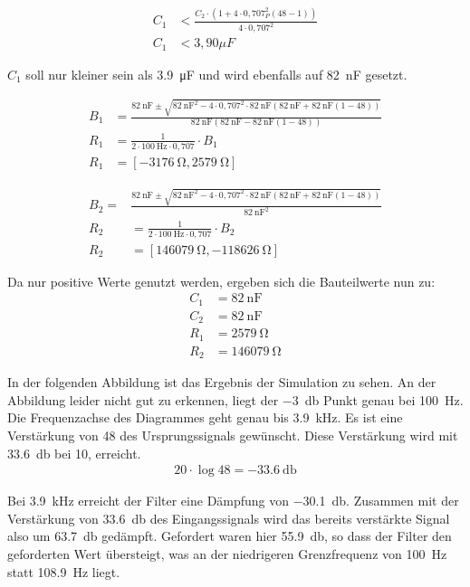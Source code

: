 \begin{align*}
C_1&<\frac{C_2\cdot(1+4\cdot0,707^2_P(48-1))}{4\cdot0,707^2}\\
C_1&<3,90\mu F
\end{align*}

$C_1$ soll nur kleiner sein als \SI{3,9}{\micro\farad} und wird ebenfalls auf \SI{82}{\nano\farad} gesetzt.

\begin{align*}
B_1&=\frac{\SI{82}{\nano\farad}\pm\sqrt{\SI{82}{\nano\farad}^2-4\cdot0,707^2\cdot\SI{82}{\nano\farad}(\SI{82}{\nano\farad}+\SI{82}{\nano\farad}(1-48))}}{\SI{82}{\nano\farad}(\SI{82}{\nano\farad}-\SI{82}{\nano\farad}(1-48))}\\
R_1&=\frac{1}{2\cdot\SI{100}{\hertz}\cdot0,707} \cdot B_1\\
R_1&=[\SI{-3176}{\ohm},\SI{2579}{\ohm}]
\end{align*}


\begin{align*}
B_2=&\frac{\SI{82}{\nano\farad}\pm\sqrt{\SI{82}{\nano\farad}^2-4\cdot0,707^2\cdot\SI{82}{\nano\farad}(\SI{82}{\nano\farad}+\SI{82}{\nano\farad}(1-48))}}{\SI{82}{\nano\farad}^2}\\
R_2&=\frac{1}{2\cdot\SI{100}{\hertz}\cdot0,707} \cdot B_2\\
R_2&=[\SI{146079}{\ohm},\SI{-118626}{\ohm}]
\end{align*}

Da nur positive Werte genutzt werden, ergeben sich die Bauteilwerte nun zu:
\begin{align*}
C_1&=\SI{82}{\nano\farad}\\
C_2&=\SI{82}{\nano\farad}\\
R_1&=\SI{2579}{\ohm}\\
R_2&=\SI{146079}{\ohm}
\end{align*}

In der folgenden Abbildung ist das Ergebnis der Simulation zu sehen. An der Abbildung leider nicht gut zu erkennen,
liegt der \SI{-3}{\decibel} Punkt genau bei \SI{100}{\hertz}. Die Frequenzachse des Diagrammes geht genau bis \SI{3,9}{\kilo\hertz}. 
Es ist eine Verstärkung von 48 des Ursprungssignals gewünscht. Diese Verstärkung wird mit \SI{33,6}{\decibel} bei 10{\hertz}, erreicht.
\begin{align*}
20\cdot\log{48}=\SI{-33,6}{\decibel}
\end{align*}

Bei \SI{3,9}{\kilo\hertz} erreicht der Filter eine Dämpfung von \SI{-30,1}{\decibel}. Zusammen mit der Verstärkung von \SI{33,6}{\decibel} des Eingangssignals 
wird das bereits verstärkte Signal also um \SI{63,7}{\decibel} gedämpft. Gefordert waren hier \SI{55,9}{\decibel}, so dass der Filter den geforderten Wert übersteigt, was an der niedrigeren Grenzfrequenz von \SI{100}{\hertz} statt \SI{108,9}{\hertz} liegt.

